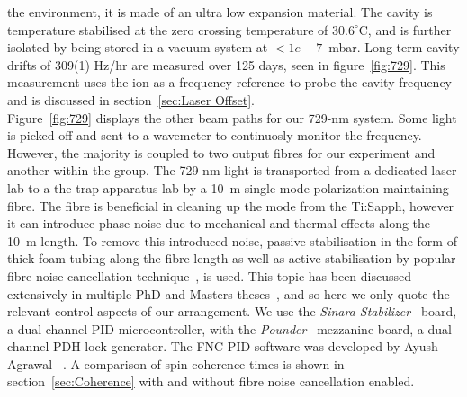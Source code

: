     the environment, it is made of an ultra low expansion material. 
    The cavity is temperature stabilised at the zero crossing temperature of
    $30.6^\circ$C, and is further isolated by being stored in a vacuum system
    at $<1e-7$~mbar. Long term cavity drifts of 309(1) Hz/hr are measured over
    125 days, seen in figure~\ref{fig:729}. This measurement uses the ion as a
    frequency reference to probe the cavity frequency and is discussed in
    section~\ref{sec:Laser Offset}.\\
    Figure~\ref{fig:729} displays the other beam paths for our 729-nm system.
    Some light is picked off and sent to a wavemeter to continuosly monitor the
    frequency. However, the majority is coupled to two output fibres for our
    experiment and another within the group. The 729-nm light is transported from
    a dedicated laser lab to a the trap apparatus lab by a 10~m
    single mode polarization maintaining fibre.  The fibre is
    beneficial in cleaning up the mode from the Ti:Sapph, however it can
    introduce phase noise due to mechanical and thermal effects along the 10~m
    length. To remove this introduced noise, passive stabilisation in
    the form of thick foam tubing along the fibre length as well as active
    stabilisation by popular fibre-noise-cancellation technique~\cite{XXX}, is used. This
    topic has been discussed extensively in multiple PhD and Masters
    theses~\cite{XXX}, and so here we only quote the relevant control aspects of
    our arrangement. We use the \emph{Sinara Stabilizer}~\cite{XXX} board, a
    dual channel PID microcontroller, with the \emph{Pounder}~\cite{XXX}
    mezzanine board, a dual channel PDH lock generator. The FNC PID software was
    developed by Ayush Agrawal ~\cite{XXX}. A comparison of spin coherence times
    is shown in section~\ref{sec:Coherence} with and without fibre noise
    cancellation enabled. \\


